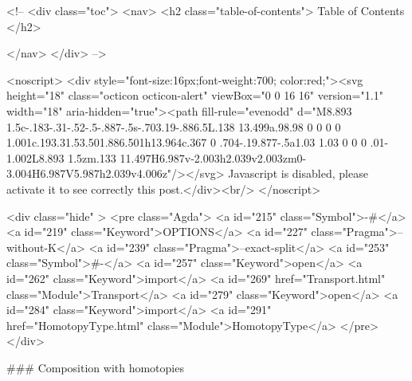   <!-- 
  <div class="toc">
    <nav>
    <h2 class="table-of-contents"> Table of Contents </h2>
      

    </nav>
  </div>
   -->

  <noscript>
  <div style="font-size:16px;font-weight:700; color:red;"><svg height="18" class="octicon octicon-alert" viewBox="0 0 16 16" version="1.1" width="18" aria-hidden="true"><path fill-rule="evenodd" d="M8.893 1.5c-.183-.31-.52-.5-.887-.5s-.703.19-.886.5L.138 13.499a.98.98 0 0 0 0 1.001c.193.31.53.501.886.501h13.964c.367 0 .704-.19.877-.5a1.03 1.03 0 0 0 .01-1.002L8.893 1.5zm.133 11.497H6.987v-2.003h2.039v2.003zm0-3.004H6.987V5.987h2.039v4.006z"/></svg> Javascript is disabled, please activate it to see correctly this post.</div><br/>
  </noscript>

  <div class="hide" >
<pre class="Agda">
<a id="215" class="Symbol">{-#</a> <a id="219" class="Keyword">OPTIONS</a> <a id="227" class="Pragma">--without-K</a> <a id="239" class="Pragma">--exact-split</a> <a id="253" class="Symbol">#-}</a>
<a id="257" class="Keyword">open</a> <a id="262" class="Keyword">import</a> <a id="269" href="Transport.html" class="Module">Transport</a>
<a id="279" class="Keyword">open</a> <a id="284" class="Keyword">import</a> <a id="291" href="HomotopyType.html" class="Module">HomotopyType</a>
</pre>
</div>


### Composition with homotopies

